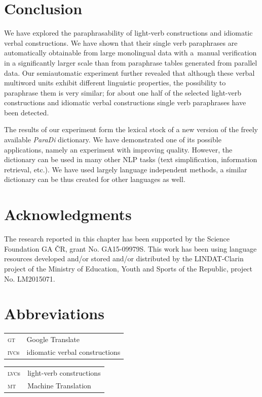 \documentclass[output=paper
,modfonts
,nonflat]{langsci/langscibook}
\begin{document}
\section{Conclusion}
We have explored the paraphrasability of   light-verb constructions and 
idiomatic verbal constructions. We have shown that their single verb 
paraphrases are automatically obtainable from large monolingual data with 
a~manual verification in a significantly larger scale than from paraphrase 
tables generated from parallel data. Our 
semiautomatic experiment further revealed that although these verbal multiword 
units exhibit different linguistic properties, the possibility to paraphrase
them is very similar; for about one half of the selected light-verb constructions 
and idiomatic verbal constructions single verb paraphrases have been detected.

The results of our experiment form the lexical stock of a new version of the 
freely available \textit{ParaDi} dictionary. We have demonstrated one of its 
possible applications, namely an experiment with improving  
quality. However, the dictionary can be used in many other NLP tasks (text 
simplification, information retrieval, etc.). We have used largely language 
independent methods, a similar dictionary can be thus created for other 
languages as well.

\section*{Acknowledgments}
The research reported in this chapter has been supported by the  Science 
Foundation GA ČR, grant No. GA15-09979S. This work has been using language 
resources developed and/or stored and/or distributed by the LINDAT-Clarin 
project of the Ministry of Education, Youth and Sports of the  Republic, 
project No. LM2015071.

\section*{Abbreviations}
\begin{tabularx}{.49\textwidth}{ll}
\textsc{gt} & Google Translate \\
\textsc{ivc}s & idiomatic verbal constructions \\
\end{tabularx}
\begin{tabularx}{.49\textwidth}{ll}
\textsc{lvc}s & light-verb constructions \\
\textsc{mt} & Machine Translation \\
\end{tabularx}

{\sloppy
\printbibliography[heading=subbibliography,notkeyword=this]
}
\end{document}
